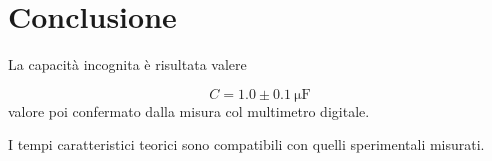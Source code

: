 \section*{Conclusione}

La capacità incognita è risultata valere

\begin{equation}
  C = 1.0 \pm 0.1 \: \si{\micro\farad}
\end{equation}
%
valore poi confermato dalla misura col multimetro digitale.

I tempi caratteristici teorici sono compatibili con quelli sperimentali misurati.
